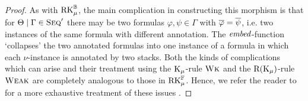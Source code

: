 \begin{proof}
  As with $\mathrm{RK}_\mu^{\mathbb{B}}$, the main complication in constructing this morphism is that
  for $\Theta \mid \Gamma \in \textsc{Seq}'$ there may be two formulas $\varphi, \psi \in
  \Gamma$ with $\overline{\varphi} = \overline{\psi}$, i.e. two instances of the same formula
  with different annotation. The $\mathit{embed}$-function `collapses' the two annotated
  formulas into one instance of a formula in which each $\nu$-instance is
  annotated by two stacks. Both the kinds of complications which can arise and
  their treatment using the $\mathrm{K}_\mu$-rule $\textsc{Wk}$ and the $\mathrm{R}(\mathrm{K}_\mu)$-rule $\textsc{Weak}$
  are completely analogous to those in $\mathrm{RK}_\mu^{\mathbb{F}}$. Hence, we refer the reader to for a
  more exhaustive treatment of these issues .



\end{proof}
